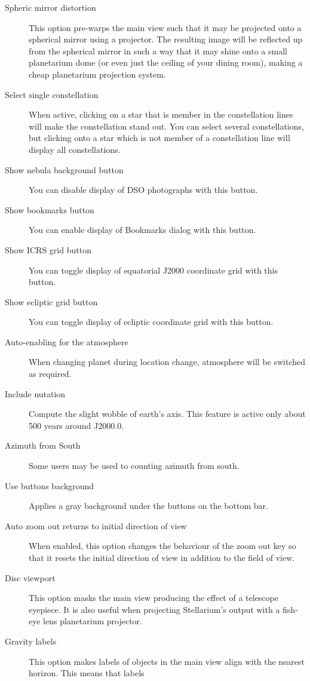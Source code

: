 \begin{description}
\item[Spheric mirror distortion] This option pre-warps the main view
  such that it may be projected onto a spherical mirror using a
  projector. The resulting image will be reflected up from the spherical
  mirror in such a way that it may shine onto a small planetarium
  dome (or even just the ceiling of your dining room), making a cheap planetarium projection system.
\item[Select single constellation] When active, clicking on a star
  that is member in the constellation lines will make the
  constellation stand out. You can select several constellations, but
  clicking onto a star which is not member of a constellation line
  will display all constellations.
\item[Show nebula background button] You can disable display of DSO
  photographs with this button.
\item[Show bookmarks button] You can enable display of Bookmarks dialog with this button.
\item[Show ICRS grid button] You can toggle display of equatorial J2000 coordinate grid with this button.
\item[Show ecliptic grid button] You can toggle display of ecliptic coordinate grid with this button.
\item[Auto-enabling for the atmosphere] When changing planet during
  location change, atmosphere will be switched as required.
\item[Include nutation] Compute the slight wobble of earth's
  axis. This feature is active only about 500 years around J2000.0.
\item[Azimuth from South] Some users may be used to counting azimuth
  from south.
\item[Use buttons background] Applies a gray background under the buttons on the bottom bar.
\item[Auto zoom out returns to initial direction of view] When enabled,
  this option changes the behaviour of the zoom out key
  \key{\textbackslash{}} so that it resets the initial direction of view in
  addition to the field of view.
\item[Disc viewport] This option masks the main view
  producing the effect of a telescope eyepiece. It is also useful when
  projecting Stellarium's output with a fish-eye lens planetarium
  projector.
\item[Gravity labels] This option makes labels of objects in the
  main view align with the nearest horizon. This means that labels

\end{description}
